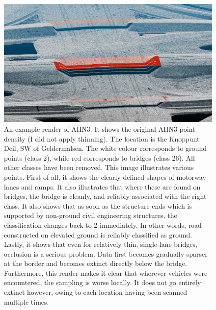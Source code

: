 \begin{figure}
    \centering
    \includegraphics[width=\linewidth]{p2/figs/ahn_sample_01.png} 
    \caption{An example render of AHN3. It shows the original AHN3 point density (I did not apply thinning). The location is the Knoppunt Deil, SW of Geldermalsen. The white colour corresponds to ground points (class 2), while red corresponds to bridges (class 26). All other classes have been removed. This image illustrates various points. First of all, it shows the clearly defined shapes of motorway lanes and ramps. It also illustrates that where these are found on bridges, the bridge is cleanly, and reliably associated with the right class. It also shows that as soon as the structure ends which is supported by non-ground civil engineering structures, the classification changes back to 2 immediately. In other words, road constructed on elevated ground is reliably classified as ground. Lastly, it shows that even for relatively thin, single-lane bridges, occlusion is a serious problem. Data first becomes gradually sparser at the border and becomes extinct directly below the bridge. Furthermore, this render makes it clear that wherever vehicles were encountered, the sampling is worse locally. It does not go entirely extinct however, owing to each location having been scanned multiple times.}
    \label{fig:ahnbridges}
\end{figure}

